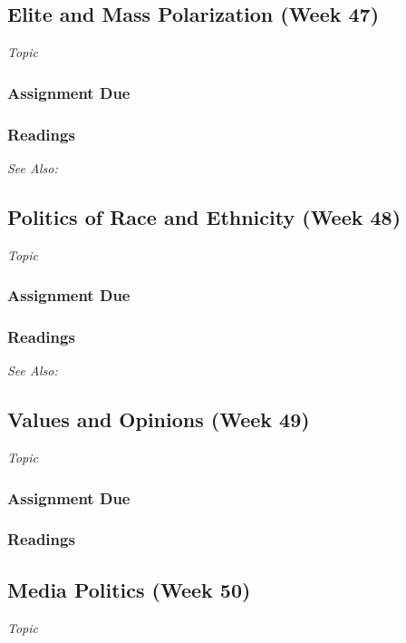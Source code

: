\documentclass[12pt,a4paper]{article}
\newcommand{\seealso}{\noindent \emph{See Also:}\\}
\begin{document}
\subsection{Elite and Mass Polarization (Week 47)}
\emph{Topic}
\vspace{1em}
\subsubsection*{Assignment Due}

\subsubsection*{Readings}

\seealso




\clearpage
\subsection{Politics of Race and Ethnicity (Week 48)}
\emph{Topic}
\vspace{1em}
\subsubsection*{Assignment Due}

\subsubsection*{Readings}

\seealso





\clearpage
\subsection{Values and Opinions (Week 49)}
\emph{Topic}
\vspace{1em}
\subsubsection*{Assignment Due}

\subsubsection*{Readings}


\clearpage
\subsection{Media Politics (Week 50)}
\emph{Topic}
\vspace{1em}
\end{document}
